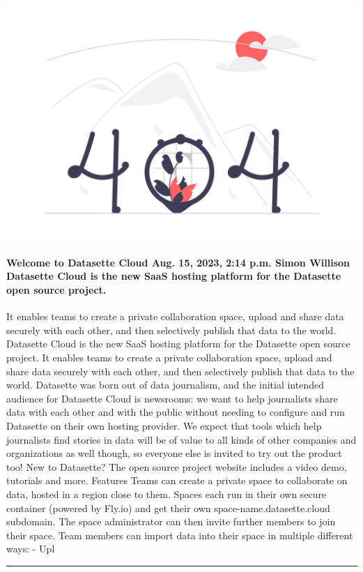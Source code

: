 \documentclass[10pt,a4paper]{article}
\begin{document}
\begin{minipage}[t]{0.80\linewidth}
\vspace{0pt}
\begin{multicols}{2}

    \href{https://www.datasette.cloud/blog/2023/welcome/?utm\_source=hackernewsletter\&utm\_medium=email\&utm\_term=fav}{
        \includegraphics[width=0.99\linewidth]{notfound.png}
    }
  
\paragraph{Welcome to Datasette Cloud
Aug. 15, 2023, 2:14 p.m. Simon Willison
Datasette Cloud is the new SaaS hosting platform for the Datasette open source project.}
 It enables teams to create a private collaboration space, upload and share data securely with each other, and then selectively publish that data to the world.
Datasette Cloud is the new SaaS hosting platform for the Datasette open source project. It enables teams to create a private collaboration space, upload and share data securely with each other, and then selectively publish that data to the world.
Datasette was born out of data journalism, and the initial intended audience for Datasette Cloud is newsrooms: we want to help journalists share data with each other and with the public without needing to configure and run Datasette on their own hosting provider.
We expect that tools which help journalists find stories in data will be of value to all kinds of other companies and organizations as well though, so everyone else is invited to try out the product too!
New to Datasette? The open source project website includes a video demo, tutorials and more.
Features
Teams can create a private space to collaborate on data, hosted in a region close to them. Spaces each run in their own secure container (powered by Fly.io) and get their own
space-name.datasette.cloud subdomain.
The space administrator can then invite further members to join their space.
Team members can import data into their space in multiple different ways:
- Upl

\end{multicols}
\end{minipage}
\par\medskip
\noindent\textcolor{red}{\rule{\linewidth}{0.2mm}}
\end{document}
